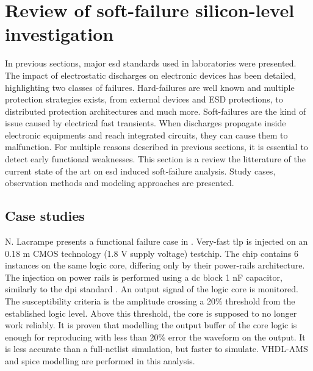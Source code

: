 \section{Review of soft-failure silicon-level investigation}

In previous sections, major \gls{esd} standards used in laboratories were presented.
The impact of electrostatic discharges on electronic devices has been detailed, highlighting two classes of failures.
Hard-failures are well known and multiple protection strategies exists, from external devices and ESD protections, to distributed protection architectures and much more.
Soft-failures are the kind of issue caused by electrical fast transients.
When discharges propagate inside electronic equipments and reach integrated circuits, they can cause them to malfunction.
For multiple reasons described in previous sections, it is essential to detect early functional weaknesses.
This section is a review the litterature of the current state of the art on \gls{esd} induced soft-failure analysis.
Study cases, observation methods and modeling approaches are presented.

\subsection{Case studies}

N. Lacrampe presents a functional failure case in \cite{LacrampeTransientImmunity}.
Very-fast \gls{tlp} is injected on an 0.18 \textmu{}m CMOS technology (1.8 V supply voltage) testchip.
The chip contains 6 instances on the same logic core, differing only by their power-rails architecture.
The injection on power rails is performed using a \gls{dc} block 1 nF capacitor, similarly to the \gls{dpi} standard \cite{iec62132-4}.
An output signal of the logic core is monitored.
The susceptibility criteria is the amplitude crossing a 20\% threshold from the established logic level.
Above this threshold, the core is supposed to no longer work reliably.
It is proven that modelling the output buffer of the core logic is enough for reproducing with less than 20\% error the waveform on the output.
It is less accurate than a full-netlist simulation, but faster to simulate.
VHDL-AMS and \gls{spice} modelling are performed in this analysis.

